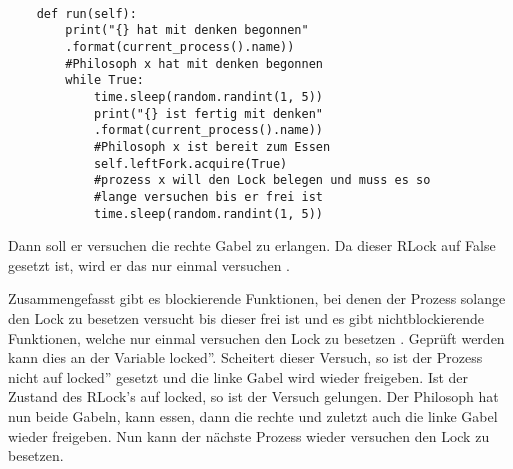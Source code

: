 \begin{lstlisting}[style = Python, caption = {Endlösung}]

    def run(self):
        print("{} hat mit denken begonnen"
        .format(current_process().name)) 
        #Philosoph x hat mit denken begonnen
        while True:
            time.sleep(random.randint(1, 5))
            print("{} ist fertig mit denken"
            .format(current_process().name)) 
            #Philosoph x ist bereit zum Essen
            self.leftFork.acquire(True) 
            #prozess x will den Lock belegen und muss es so 
            #lange versuchen bis er frei ist
            time.sleep(random.randint(1, 5))

\end{lstlisting}

Dann soll er versuchen die rechte Gabel zu erlangen. Da dieser RLock auf False gesetzt ist, wird er das nur einmal versuchen \parencite[vgl.]{lock}.

Zusammengefasst gibt es blockierende Funktionen, bei denen der Prozess solange den Lock zu besetzen versucht bis dieser frei ist und es gibt nichtblockierende Funktionen, welche nur einmal versuchen den Lock zu besetzen \parencite[vgl.][S.164]{sturm2001}. Geprüft werden kann dies an der Variable \glqq locked''. Scheitert dieser Versuch, so ist der Prozess nicht auf \glqq locked'' gesetzt und die linke Gabel wird wieder freigeben. Ist der Zustand des RLock's auf locked, so ist der Versuch gelungen.  Der Philosoph hat nun beide Gabeln, kann essen, dann die rechte und zuletzt auch die linke Gabel wieder freigeben. Nun kann der nächste Prozess wieder versuchen den Lock zu besetzen.

